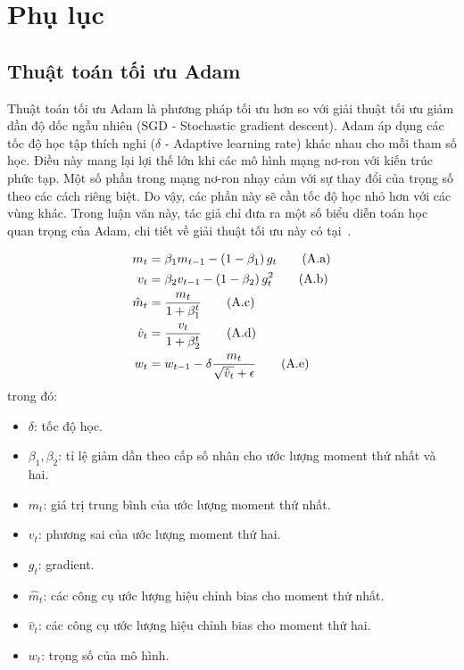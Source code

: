 \clearpage
{}

\chapter*{Phụ lục}

\renewcommand{\thesection}{\Alph{section}}

\section{Thuật toán tối ưu Adam}
\label{sec:adam}
Thuật toán tối ưu Adam là phương pháp tối ưu hơn so với giải thuật tối ưu giảm dần độ dốc ngẫu nhiên (SGD - Stochastic gradient descent). Adam áp dụng các tốc độ học tập thích nghi ($\delta$ - Adaptive learning rate) khác nhau cho mỗi tham số học. Điều này mang lại lợi thế lớn khi các mô hình mạng nơ-ron với kiến trúc phức tạp. Một số phần trong mạng nơ-ron nhạy cảm với sự thay đổi của trọng số theo các cách riêng biệt. Do vậy, các phần này sẽ cần tốc độ học nhỏ hơn với các vùng khác. Trong luận văn này, tác giả chỉ đưa ra một số biểu diễn toán học quan trọng của Adam, chi tiết về giải thuật tối ưu này có tại~\cite{Diederik2014}.

\begin{subequations}
    \begin{align}
        m_t &=\beta_1 m_{t-1}-\left(1-\beta_1\right) g_t  \tag{$\text{A.a}$}\\
        v_t &=\beta_2 v_{t-1}-\left(1-\beta_2\right) g_t^2 \tag{$\text{A.b}$}\\
        \hat{m}_t &=\frac{m_t}{1+\beta_1^t} \tag{$\text{A.c}$}\\
        \hat{v}_t &=\frac{v_t}{1+\beta_2^t} \tag{$\text{A.d}$}\\
        w_t &= w_{t-1}-\delta \frac{m_t}{\sqrt{\hat{v}_t}+\epsilon} \tag{$\text{A.e}$}
    \end{align}
\end{subequations}
trong đó:
\begin{itemize}[-]
    \item  $\delta$: tốc độ học.
    \item  $\beta_1, \beta_2$: tỉ lệ giảm dần theo cấp số nhân cho ước lượng moment thứ nhất và hai.
    \item  $m_t$: giá trị trung bình của ước lượng moment thứ nhất.
    \item  $v_t$: phương sai của ước lượng moment thứ hai.
    \item  $g_t$: gradient.
    \item  $\hat{m}_t$: các công cụ ước lượng hiệu chỉnh bias cho moment thứ nhất.
    \item $\hat{v}_t$: các công cụ ước lượng hiệu chỉnh bias cho moment thứ hai.
    \item $w_t$: trọng số của mô hình.
\end{itemize}
